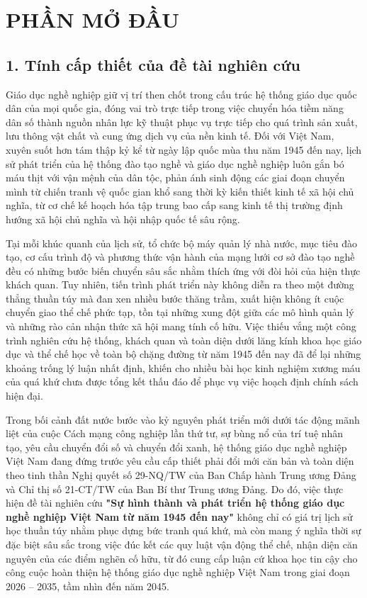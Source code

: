 \section*{PHẦN MỞ ĐẦU}

\subsection*{1. Tính cấp thiết của đề tài nghiên cứu}

Giáo dục nghề nghiệp giữ vị trí then chốt trong cấu trúc hệ thống giáo dục quốc dân của mọi quốc gia, đóng vai trò trực tiếp trong việc chuyển hóa tiềm năng dân số thành nguồn nhân lực kỹ thuật phục vụ trực tiếp cho quá trình sản xuất, lưu thông vật chất và cung ứng dịch vụ của nền kinh tế. Đối với Việt Nam, xuyên suốt hơn tám thập kỷ kể từ ngày lập quốc mùa thu năm 1945 đến nay, lịch sử phát triển của hệ thống đào tạo nghề và giáo dục nghề nghiệp luôn gắn bó máu thịt với vận mệnh của dân tộc, phản ánh sinh động các giai đoạn chuyển mình từ chiến tranh vệ quốc gian khổ sang thời kỳ kiến thiết kinh tế xã hội chủ nghĩa, từ cơ chế kế hoạch hóa tập trung bao cấp sang kinh tế thị trường định hướng xã hội chủ nghĩa và hội nhập quốc tế sâu rộng.

Tại mỗi khúc quanh của lịch sử, tổ chức bộ máy quản lý nhà nước, mục tiêu đào tạo, cơ cấu trình độ và phương thức vận hành của mạng lưới cơ sở đào tạo nghề đều có những bước biến chuyển sâu sắc nhằm thích ứng với đòi hỏi của hiện thực khách quan. Tuy nhiên, tiến trình phát triển này không diễn ra theo một đường thẳng thuần túy mà đan xen nhiều bước thăng trầm, xuất hiện không ít cuộc chuyển giao thể chế phức tạp, tồn tại những xung đột giữa các mô hình quản lý và những rào cản nhận thức xã hội mang tính cố hữu. Việc thiếu vắng một công trình nghiên cứu hệ thống, khách quan và toàn diện dưới lăng kính khoa học giáo dục và thể chế học về toàn bộ chặng đường từ năm 1945 đến nay đã để lại những khoảng trống lý luận nhất định, khiến cho nhiều bài học kinh nghiệm xương máu của quá khứ chưa được tổng kết thấu đáo để phục vụ việc hoạch định chính sách hiện đại.

Trong bối cảnh đất nước bước vào kỷ nguyên phát triển mới dưới tác động mãnh liệt của cuộc Cách mạng công nghiệp lần thứ tư, sự bùng nổ của trí tuệ nhân tạo, yêu cầu chuyển đổi số và chuyển đổi xanh, hệ thống giáo dục nghề nghiệp Việt Nam đang đứng trước yêu cầu cấp thiết phải đổi mới căn bản và toàn diện theo tinh thần Nghị quyết số 29-NQ/TW của Ban Chấp hành Trung ương Đảng và Chỉ thị số 21-CT/TW của Ban Bí thư Trung ương Đảng. Do đó, việc thực hiện đề tài nghiên cứu \textbf{"Sự hình thành và phát triển hệ thống giáo dục nghề nghiệp Việt Nam từ năm 1945 đến nay"} không chỉ có giá trị lịch sử học thuần túy nhằm phục dựng bức tranh quá khứ, mà còn mang ý nghĩa thời sự đặc biệt sâu sắc trong việc đúc kết các quy luật vận động thể chế, nhận diện căn nguyên của các điểm nghẽn cố hữu, từ đó cung cấp luận cứ khoa học tin cậy cho công cuộc hoàn thiện hệ thống giáo dục nghề nghiệp Việt Nam trong giai đoạn 2026 -- 2035, tầm nhìn đến năm 2045.

